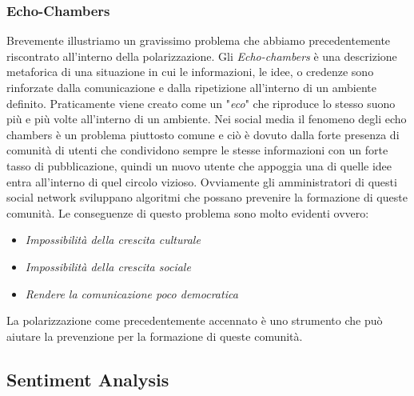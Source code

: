 \subsubsection{Echo-Chambers}
Brevemente illustriamo un gravissimo problema che abbiamo precedentemente riscontrato all'interno della polarizzazione.
Gli \textit{Echo-chambers} è una descrizione metaforica di una situazione in cui le informazioni, le idee, o credenze sono rinforzate dalla comunicazione e dalla ripetizione all'interno di un ambiente definito. Praticamente viene creato come un "\textit{eco}" che riproduce lo stesso suono più e più volte all'interno di un ambiente. 
Nei social media il fenomeno degli echo chambers è un problema piuttosto comune e ciò è dovuto dalla forte presenza di comunità di utenti che condividono sempre le stesse informazioni con un forte tasso di pubblicazione, quindi un nuovo utente che appoggia una di quelle idee entra all'interno di quel circolo vizioso. Ovviamente gli amministratori di questi social network sviluppano algoritmi che possano prevenire la formazione di queste comunità.
Le conseguenze di questo problema sono molto evidenti ovvero:
\begin{itemize}
\item \textit{Impossibilità della crescita culturale}
\item \textit{Impossibilità della crescita sociale}
\item \textit{Rendere la comunicazione poco democratica}
\end{itemize}
La polarizzazione come precedentemente accennato è uno strumento che può aiutare la prevenzione per la formazione di queste comunità.

\subsection{Sentiment Analysis}

